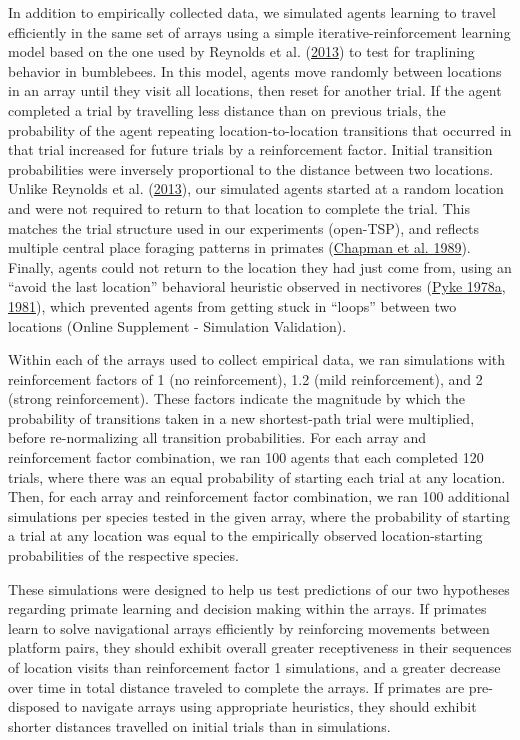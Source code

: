 \documentclass[twoside,12pt,final]{ucthesis-CA2012}
\begin{document}
\begin{ucmainmatter}
In addition to empirically collected data, we simulated agents learning to travel efficiently in the same set of arrays using a simple iterative-reinforcement learning model based on the one used by Reynolds et al. (\protect\hyperlink{ref-reynolds2013}{2013}) to test for traplining behavior in bumblebees. In this model, agents move randomly between locations in an array until they visit all locations, then reset for another trial. If the agent completed a trial by travelling less distance than on previous trials, the probability of the agent repeating location-to-location transitions that occurred in that trial increased for future trials by a reinforcement factor. Initial transition probabilities were inversely proportional to the distance between two locations. Unlike Reynolds et al. (\protect\hyperlink{ref-reynolds2013}{2013}), our simulated agents started at a random location and were not required to return to that location to complete the trial. This matches the trial structure used in our experiments (open-TSP), and reflects multiple central place foraging patterns in primates (\protect\hyperlink{ref-chapman1989}{Chapman et al. 1989}). Finally, agents could not return to the location they had just come from, using an ``avoid the last location'' behavioral heuristic observed in nectivores (\protect\hyperlink{ref-pyke1978}{Pyke 1978a}, \protect\hyperlink{ref-pyke1981}{1981}), which prevented agents from getting stuck in ``loops'' between two locations (Online Supplement - Simulation Validation).

Within each of the arrays used to collect empirical data, we ran simulations with reinforcement factors of 1 (no reinforcement), 1.2 (mild reinforcement), and 2 (strong reinforcement). These factors indicate the magnitude by which the probability of transitions taken in a new shortest-path trial were multiplied, before re-normalizing all transition probabilities. For each array and reinforcement factor combination, we ran 100 agents that each completed 120 trials, where there was an equal probability of starting each trial at any location. Then, for each array and reinforcement factor combination, we ran 100 additional simulations per species tested in the given array, where the probability of starting a trial at any location was equal to the empirically observed location-starting probabilities of the respective species.

These simulations were designed to help us test predictions of our two hypotheses regarding primate learning and decision making within the arrays. If primates learn to solve navigational arrays efficiently by reinforcing movements between platform pairs, they should exhibit overall greater receptiveness in their sequences of location visits than reinforcement factor 1 simulations, and a greater decrease over time in total distance traveled to complete the arrays. If primates are pre-disposed to navigate arrays using appropriate heuristics, they should exhibit shorter distances travelled on initial trials than in simulations.


\end{ucmainmatter}
\end{document}
